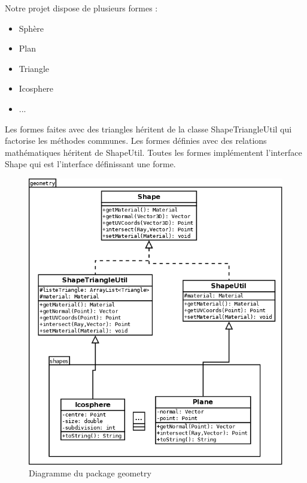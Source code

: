 \documentclass[12pt]{article}
\begin{document}
Notre projet dispose de plusieurs formes : 
\begin{itemize}
\item {Sphère}
\item {Plan}
\item {Triangle}
\item {Icosphere}
\item {...}
\end{itemize}
Les formes faites avec des triangles héritent de la classe ShapeTriangleUtil qui factorise les méthodes communes. Les formes définies avec des relations mathématiques héritent de ShapeUtil. Toutes les formes implémentent l'interface Shape qui est l'interface définissant une forme. 

\begin{figure}[ht]
\begin{center}
\includegraphics[width = 0.8 \textwidth]{diagrammes/package_geometry.png}
\caption{Diagramme du package geometry}
\end{center}
\end{figure}
\FloatBarrier
\end{document}
